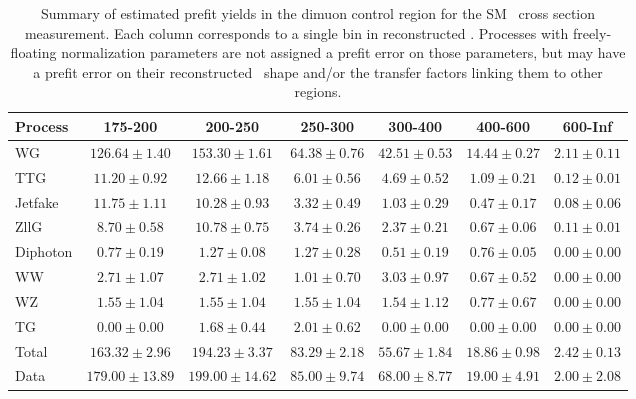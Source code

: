 \begin{table}[htbp]
  \begin{center}
    \caption{Summary of estimated prefit yields in the dimuon control region for the SM \zinvg\ cross section measurement.
    Each column corresponds to a single bin in reconstructed \ETgamma. Processes with freely-floating normalization parameters
    are not assigned a prefit error on those parameters, but may have a prefit error on their reconstructed \ETgamma\ shape
    and/or the transfer factors linking them to other regions.}
    \label{tab:BkgSummaryMonomu_prefit}
    \begin{tabular}{|l|c|c|c|c|c|c|}
      \hline
      Process & 175-200 & 200-250 & 250-300 & 300-400 & 400-600 & 600-Inf \\
      \hline
      WG & $126.64{\pm}1.40$ & $153.30{\pm}1.61$ & $64.38{\pm}0.76$ & $42.51{\pm}0.53$ & $14.44{\pm}0.27$ & $2.11{\pm}0.11$ \\
      TTG & $11.20{\pm}0.92$ & $12.66{\pm}1.18$ & $6.01{\pm}0.56$ & $4.69{\pm}0.52$ & $1.09{\pm}0.21$ & $0.12{\pm}0.01$ \\
      Jetfake & $11.75{\pm}1.11$ & $10.28{\pm}0.93$ & $3.32{\pm}0.49$ & $1.03{\pm}0.29$ & $0.47{\pm}0.17$ & $0.08{\pm}0.06$ \\
      ZllG & $8.70{\pm}0.58$ & $10.78{\pm}0.75$ & $3.74{\pm}0.26$ & $2.37{\pm}0.21$ & $0.67{\pm}0.06$ & $0.11{\pm}0.01$ \\
      Diphoton & $0.77{\pm}0.19$ & $1.27{\pm}0.08$ & $1.27{\pm}0.28$ & $0.51{\pm}0.19$ & $0.76{\pm}0.05$ & $0.00{\pm}0.00$ \\
      WW & $2.71{\pm}1.07$ & $2.71{\pm}1.02$ & $1.01{\pm}0.70$ & $3.03{\pm}0.97$ & $0.67{\pm}0.52$ & $0.00{\pm}0.00$ \\
      WZ & $1.55{\pm}1.04$ & $1.55{\pm}1.04$ & $1.55{\pm}1.04$ & $1.54{\pm}1.12$ & $0.77{\pm}0.67$ & $0.00{\pm}0.00$ \\
      TG & $0.00{\pm}0.00$ & $1.68{\pm}0.44$ & $2.01{\pm}0.62$ & $0.00{\pm}0.00$ & $0.00{\pm}0.00$ & $0.00{\pm}0.00$ \\
      \hline
      Total & $163.32{\pm}2.96$ & $194.23{\pm}3.37$ & $83.29{\pm}2.18$ & $55.67{\pm}1.84$ & $18.86{\pm}0.98$ & $2.42{\pm}0.13$ \\
      \hline
      Data & $179.00{\pm}13.89$ & $199.00{\pm}14.62$ & $85.00{\pm}9.74$ & $68.00{\pm}8.77$ & $19.00{\pm}4.91$ & $2.00{\pm}2.08$ \\
      \hline
    \end{tabular}
  \end{center}
\end{table}

